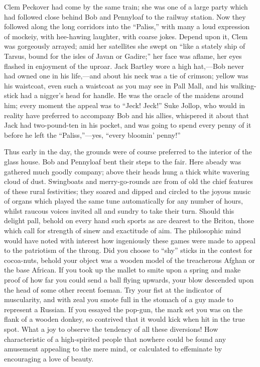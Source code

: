 Clem Peckover had come by the same train; she was one of a large party
which had followed close behind Bob and Pennyloaf to the railway
station. Now they followed along the long corridors into the ``Paliss,''
with many a loud expression of mockeiy, with hee-hawing laughter, with
coarse jokes. Depend upon it, Clem was gorgeously arrayed; amid her
satellites she swept on ``like a stately ship of Tarsus, bound for the
isles of Javan or Gadire;'' her face was aflame, her eyes flashed in
enjoyment of the {}uproar. Jack Bartley wore a high hat,---Bob never had
owned one in his life,---and about his neck was a tie of crimson; yellow
was his waistcoat, even such a waistcoat as you may see in Pall Mall,
and his walking-stick had a nigger's head for handle. He was the oracle
of the maidens around him; every moment the appeal was to ``Jeck!
Jeck!'' Suke Jollop, who would in reality have preferred to accompany
Bob and his allies, whispered it about that Jack had two-pound-ten in
his pocket, and was going to spend every penny of it before he left the
``Paliss,''---yes, ``every bloomin' penny!''

Thus early in the day, the grounds were of course preferred to the
interior of the glass house. Bob and Pennyloaf bent their steps to the
fair. Here abeady was gathered much goodly company; above their heads
hung a thick white wavering cloud of dust. Swingboats and
merry-go-rounds are from of old the chief features of these rural
festivities; they soared and dipped and circled to the joyous music of
organs which played the {}same tune automatically for any number of
hours, whilst raucous voices invited all and sundry to take their turn.
Should this delight pall, behold on every hand such sports as are
dearest to the Briton, those which call for strength of sinew and
exactitude of aim. The philosophic mind would have noted with interest
how ingeniously these games were made to appeal to the patriotism of the
throng. Did you choose to ``shy'' sticks in the contest for cocoa-nuts,
behold your object was a wooden model of the treacherous Afghan or the
base African. If you took up the mallet to smite upon a spring and make
proof of how far you could send a ball flying upwards, your blow
descended upon the head of some other recent foeman. Try your fist at
the indicator of muscularity, and with zeal you smote full in the
stomach of a guy made to represent a Russian. If you essayed the
pop-gun, the mark set you was on the flank of a wooden donkey, so
contrived that it would kick when hit in the true spot. What a joy to
observe the {}tendency of all these diversions! How characteristic of a
high-spirited people that nowhere could be found any amusement appealing
to the mere mind, or calculated to effeminate by encouraging a love of
beauty.

